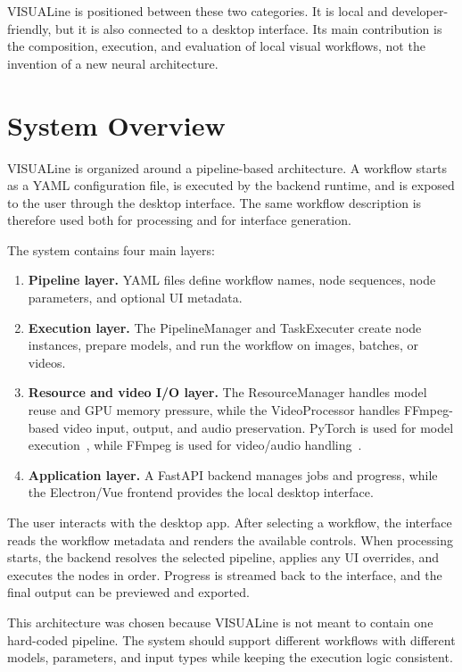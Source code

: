 \documentclass[11pt,a4paper]{article}
\begin{document}
VISUALine is positioned between these two categories. It is local and developer-friendly, but it is also connected to a desktop interface. Its main contribution is the composition, execution, and evaluation of local visual workflows, not the invention of a new neural architecture.

\section{System Overview}

VISUALine is organized around a pipeline-based architecture. A workflow starts as a YAML configuration file, is executed by the backend runtime, and is exposed to the user through the desktop interface. The same workflow description is therefore used both for processing and for interface generation.

The system contains four main layers:

\begin{enumerate}[leftmargin=*]
    \item \textbf{Pipeline layer.} YAML files define workflow names, node sequences, node parameters, and optional UI metadata.
    \item \textbf{Execution layer.} The PipelineManager and TaskExecuter create node instances, prepare models, and run the workflow on images, batches, or videos.
    \item \textbf{Resource and video I/O layer.} The ResourceManager handles model reuse and GPU memory pressure, while the VideoProcessor handles FFmpeg-based video input, output, and audio preservation. PyTorch is used for model execution~\cite{paszke2019pytorch}, while FFmpeg is used for video/audio handling~\cite{ffmpeg}.
    \item \textbf{Application layer.} A FastAPI backend manages jobs and progress, while the Electron/Vue frontend provides the local desktop interface.
\end{enumerate}

The user interacts with the desktop app. After selecting a workflow, the interface reads the workflow metadata and renders the available controls. When processing starts, the backend resolves the selected pipeline, applies any UI overrides, and executes the nodes in order. Progress is streamed back to the interface, and the final output can be previewed and exported.

This architecture was chosen because VISUALine is not meant to contain one hard-coded pipeline. The system should support different workflows with different models, parameters, and input types while keeping the execution logic consistent.
\end{document}
